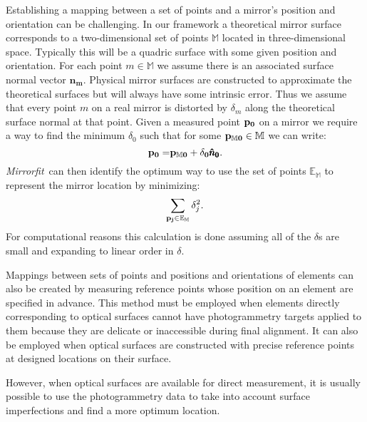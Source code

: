 \documentclass{article}
\newcommand{\mf}{\textit{Mirrorfit}}
\newcommand{\sfont}[1]{\mathbb{#1}}
\begin{document}
Establishing a mapping between a set of points and a mirror's position and orientation can be challenging.
In our framework a theoretical mirror surface corresponds to a two-dimensional set of points $\sfont{M}$ located in three-dimensional space.
Typically this will be a quadric surface with some given position and orientation.
For each point $m \in \sfont{M}$ we assume there is an associated surface normal vector $\pmb{\hat{n}_m}$.
Physical mirror surfaces are constructed to approximate the theoretical surfaces but will always have some intrinsic error. 
Thus we assume that every point $m$ on a real mirror is distorted by $\delta_m$ along the theoretical surface normal at that point. 
Given a measured point $\bf{p_0}$ on a mirror we require a way to find the minimum $\delta_0$ such that for some $\bf{p_{\sfont{M}0}} \in \sfont{M}$ we can write:
$$\bf{p_0 = }\bf{p_{\sfont{M}0}} + \delta_0 \pmb{\hat{n}_0}.$$
\mf\ can then identify the optimum way to use the set of points $\sfont{E}_\sfont{M}$ to represent the mirror location by minimizing: 
$$\sum_{\bf{p_j} \in \sfont{E}_\sfont{M}} \delta_j^2.$$ 
For computational reasons this calculation is done assuming all of the $\delta$s are small and expanding to linear order in $\delta$. 


Mappings between sets of points and positions and orientations of elements can also be created by measuring reference points whose position on an element are specified in advance.
This method must be employed when elements directly corresponding to optical surfaces cannot have photogrammetry targets applied to them because they are delicate or inaccessible during final alignment.
It can also be employed when optical surfaces are constructed with precise reference points at designed locations on their surface.

However, when optical surfaces are available for direct measurement, it is usually possible to use the photogrammetry data to take into account surface imperfections and find a more optimum location.
\end{document}
